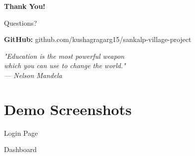 \documentclass[aspectratio=169]{beamer}
\begin{document}
\begin{frame}
    \begin{center}
        \Huge\textbf{Thank You!}
        
        \vspace{2em}
        
        \Large Questions?
        
        \vspace{2em}
        
        \normalsize
        \textbf{GitHub:} github.com/kushagragarg15/sankalp-village-project
        
        \vspace{1em}
        
        \textit{"Education is the most powerful weapon\\which you can use to change the world."}\\
        \textit{— Nelson Mandela}
    \end{center}
\end{frame}

\appendix
\section{Demo Screenshots}

\begin{frame}{Login Page}
    \begin{center}
    \end{center}
\end{frame}

\begin{frame}{Dashboard}
    \begin{center}
    \end{center}
\end{frame}
\end{document}
